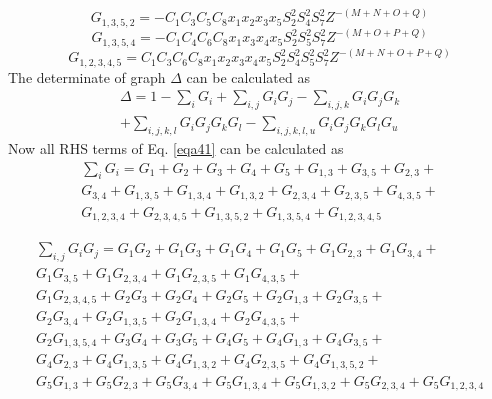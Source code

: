 \documentclass{osa-article}
\begin{document}
 \begin{equation}
G_{1,3,5,2}=-C_1C_3C_5C_8x_1x_2x_3x_5{S^2_2}{S^2_4}{S^2_7}Z^{-(M+N+O+Q)}
\label{eqa38}
\end{equation}
 \begin{equation}
G_{1,3,5,4}=-C_1C_4C_6C_8x_1x_3x_4x_5{S^2_2}{S^2_5}{S^2_7}Z^{-(M+O+P+Q)}
\label{eqa39}
\end{equation}
 \begin{equation}
G_{1,2,3,4,5}=C_1C_3C_6C_8x_1x_2x_3x_4x_5{S^2_2}{S^2_4}{S^2_5}{S^2_7}Z^{-(M+N+O+P+Q)}
\label{eqa40}
\end{equation}
The determinate of graph \textit {$\Delta$} can be calculated as\\
\begin{equation}
\begin{split}
\Delta=
1-\sum_{i} {G_i}+\sum_{i,j} {G_i G_j}-\sum_{i,j,k} {G_i G_j G_k}\\+\sum_{i,j,k,l} {G_i G_j G_kG_l}-\sum_{i,j,k,l,u} {G_i G_j G_kG_lG_u} 
\label{eqa41}
\end{split}
\end{equation}
Now all RHS terms of Eq. \ref{eqa41} can be calculated as\\
\begin{equation}
\begin{split}
\sum_{i} {G_i}=G_1+G_2+G_3+G_4+G_5+G_{1,3}+G_{3,5}+G_{2,3}+\\G_{3,4}+G_{1,3,5}+G_{1,3,4}+G_{1,3,2}+G_{2,3,4}+G_{2,3,5}+G_{4,3,5}+\\G_{1,2,3,4}+G_{2,3,4,5}+G_{1,3,5,2}+G_{1,3,5,4}+G_{1,2,3,4,5} 
\label{eqa42}
\end{split}
\end{equation}

\begin{equation}
\begin{split}
\sum_{i,j} {G_i G_j}=G_1G_2+G_1G_3+G_1G_4+G_1G_5+G_1G_{2,3}+G_1G_{3,4}
+\\G_1G_{3,5}+G_1G_{2,3,4}+G_1G_{2,3,5}+G_1G_{4,3,5}+\\G_1G_{2,3,4,5}+G_2G_3+G_2G_4+G_2G_5+G_2G_{1,3}+G_2G_{3,5}+\\G_2G_{3,4}+G_2G_{1,3,5}+G_2G_{1,3,4}+G_2G_{4,3,5}+\\G_2G_{1,3,5,4}+G_3G_4+G_3G_5+G_4G_5+G_4G_{1,3}+G_4G_{3,5}+\\G_4G_{2,3}+G_4G_{1,3,5}+G_4G_{1,3,2}+G_4G_{2,3,5}+G_4G_{1,3,5,2}+\\G_5G_{1,3}+G_5G_{2,3}+G_5G_{3,4}+G_5G_{1,3,4}+G_5G_{1,3,2}+G_5G_{2,3,4}+G_5G_{1,2,3,4} 
\label{eqa43}
\end{split}
\end{equation}
\end{document}
